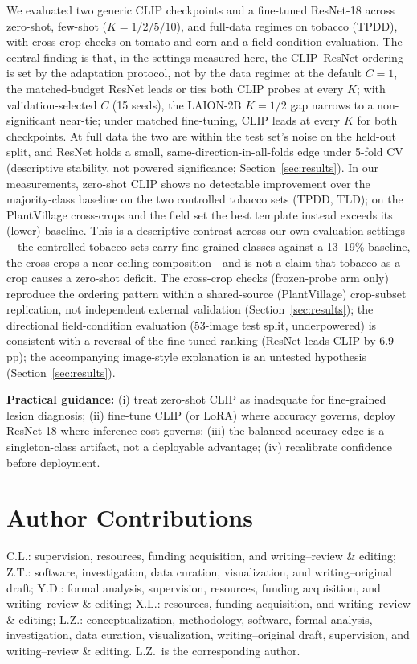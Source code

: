 \documentclass[10pt,a4paper]{article}
\begin{document}
We evaluated two generic CLIP checkpoints and a fine-tuned ResNet-18 across zero-shot, few-shot ($K{=}1/2/5/10$), and full-data regimes on tobacco (TPDD), with cross-crop checks on tomato and corn and a field-condition evaluation. The central finding is that, in the settings measured here, the CLIP--ResNet ordering is set by the adaptation protocol, not by the data regime: at the default $C{=}1$, the matched-budget ResNet leads or ties both CLIP probes at every $K$; with validation-selected $C$ (15 seeds), the LAION-2B $K{=}1/2$ gap narrows to a non-significant near-tie; under matched fine-tuning, CLIP leads at every $K$ for both checkpoints. At full data the two are within the test set's noise on the held-out split, and ResNet holds a small, same-direction-in-all-folds edge under 5-fold CV (descriptive stability, not powered significance; Section~\ref{sec:results}). In our measurements, zero-shot CLIP shows no detectable improvement over the majority-class baseline on the two controlled tobacco sets (TPDD, TLD); on the PlantVillage cross-crops and the field set the best template instead exceeds its (lower) baseline. This is a descriptive contrast across our own evaluation settings---the controlled tobacco sets carry fine-grained classes against a 13--19\% baseline, the cross-crops a near-ceiling composition---and is not a claim that tobacco as a crop causes a zero-shot deficit. The cross-crop checks (frozen-probe arm only) reproduce the ordering pattern within a shared-source (PlantVillage) crop-subset replication, not independent external validation (Section~\ref{sec:results}); the directional field-condition evaluation (53-image test split, underpowered) is consistent with a reversal of the fine-tuned ranking (ResNet leads CLIP by 6.9\,pp); the accompanying image-style explanation is an untested hypothesis (Section~\ref{sec:results}).

\textbf{Practical guidance:} (i) treat zero-shot CLIP as inadequate for fine-grained lesion diagnosis; (ii) fine-tune CLIP (or LoRA) where accuracy governs, deploy ResNet-18 where inference cost governs; (iii) the balanced-accuracy edge is a singleton-class artifact, not a deployable advantage; (iv) recalibrate confidence before deployment.

\section*{Author Contributions}
C.L.: supervision, resources, funding acquisition, and writing--review \& editing; Z.T.: software, investigation, data curation, visualization, and writing--original draft; Y.D.: formal analysis, supervision, resources, funding acquisition, and writing--review \& editing; X.L.: resources, funding acquisition, and writing--review \& editing; L.Z.: conceptualization, methodology, software, formal analysis, investigation, data curation, visualization, writing--original draft, supervision, and writing--review \& editing. L.Z.\ is the corresponding author.
\end{document}
